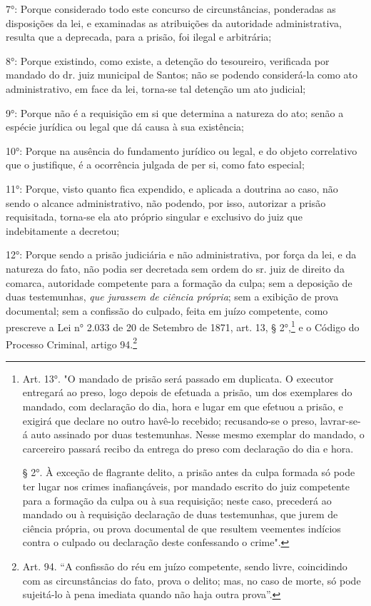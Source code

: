 7°: Porque considerado todo este concurso de circunstâncias, ponderadas
as disposições da lei, e examinadas as atribuições da autoridade
administrativa, resulta que a deprecada, para a prisão, foi ilegal e
arbitrária;

8°: Porque existindo, como existe, a detenção do tesoureiro, verificada
por mandado do dr. juiz municipal de Santos; não se podendo considerá-la
como ato administrativo, em face da lei, torna-se tal detenção um ato
judicial;

9°: Porque não é a requisição em si que determina a natureza do ato;
senão a espécie jurídica ou legal que dá causa à sua existência;

10°: Porque na ausência do fundamento jurídico ou legal, e do objeto
correlativo que o justifique, é a ocorrência julgada de per si, como
fato especial;

11°: Porque, visto quanto fica expendido, e aplicada a doutrina ao caso,
não sendo o alcance administrativo, não podendo, por isso, autorizar a
prisão requisitada, torna-se ela ato próprio singular e exclusivo do
juiz que indebitamente a decretou;

12°: Porque sendo a prisão judiciária e não administrativa, por força da
lei, e da natureza do fato, não podia ser decretada sem ordem do sr.
juiz de direito da comarca, autoridade competente para a formação da
culpa; sem a deposição de duas testemunhas, \emph{que jurassem de
ciência própria}; sem a exibição de prova documental; sem a confissão do
culpado, feita em juízo competente, como prescreve a Lei n° 2.033 de 20
de Setembro de 1871, art. 13, § 2°,\footnote{Art. 13°. "O mandado de
  prisão será passado em duplicata. O executor entregará ao preso, logo
  depois de efetuada a prisão, um dos exemplares do mandado, com
  declaração do dia, hora e lugar em que efetuou a prisão, e exigirá que
  declare no outro havê-lo recebido; recusando-se o preso, lavrar-se-á
  auto assinado por duas testemunhas. Nesse mesmo exemplar do mandado, o
  carcereiro passará recibo da entrega do preso com declaração do dia e
  hora.

  § 2°. À exceção de flagrante delito, a prisão antes da culpa formada
  só pode ter lugar nos crimes inafiançáveis, por mandado escrito do
  juiz competente para a formação da culpa ou à sua requisição; neste
  caso, precederá ao mandado ou à requisição declaração de duas
  testemunhas, que jurem de ciência própria, ou prova documental de que
  resultem veementes indícios contra o culpado ou declaração deste
  confessando o crime".} e o Código do Processo Criminal, artigo
94.\footnote{Art. 94. ``A confissão do réu em juízo competente, sendo
  livre, coincidindo com as circunstâncias do fato, prova o delito; mas,
  no caso de morte, só pode sujeitá-lo à pena imediata quando não haja
  outra prova''.}

